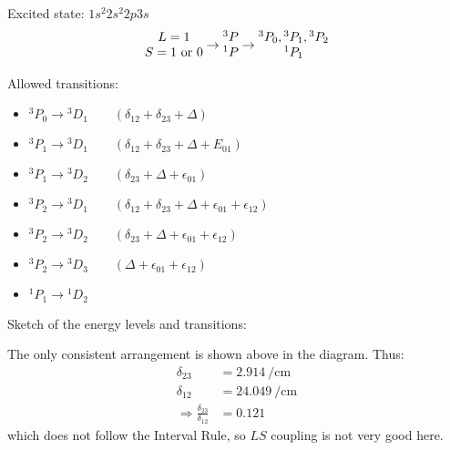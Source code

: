 \begin{parts}
	Excited state: $1s^2 2s^2 2p 3s$
	\begin{equation*}
		\begin{matrix}
			L=1 \\
			S=1 \textnormal{ or } 0
		\end{matrix}
		\rightarrow
		\begin{matrix}
			{}^3 P \\
			{}^1 P
		\end{matrix}
		\rightarrow
		\begin{matrix}
			{}^3 P_0, {}^3 P_1, {}^3 P_2 \\
			{}^1 P_1
		\end{matrix}
	\end{equation*}
	
	Allowed transitions:
	\begin{itemize}
		\item ${}^3 P_0 \to {}^3 D_1 \qquad (\delta_{12} + \delta_{23} + \Delta)$
		\item ${}^3 P_1 \to {}^3 D_1 \qquad (\delta_{12} + \delta_{23} + \Delta + E_{01})$
		\item ${}^3 P_1 \to {}^3 D_2 \qquad (\delta_{23} + \Delta + \epsilon_{01})$
		\item ${}^3 P_2 \to {}^3 D_1 \qquad (\delta_{12} + \delta_{23} + \Delta + \epsilon_{01} + \epsilon_{12})$
		\item ${}^3 P_2 \to {}^3 D_2 \qquad (\delta_{23} + \Delta + \epsilon_{01} + \epsilon_{12})$
		\item ${}^3 P_2 \to {}^3 D_3 \qquad (\Delta + \epsilon_{01} + \epsilon_{12})$
		\item ${}^1 P_1 \to {}^1 D_2$
	\end{itemize}
	
	\newpage
	Sketch of the energy levels and transitions:
	
	The only consistent arrangement is shown above in the diagram.
	Thus:
	\begin{align*}
		\delta_{23} &= \SI{2.914}{\per\centi\metre} \\
		\delta_{12} &= \SI{24.049}{\per\centi\metre} \\
		\Rightarrow \frac{\delta_{23}}{\delta_{12}} &= \num{0.121}
	\end{align*}
	which does not follow the Interval Rule, so $LS$ coupling is not very good here.
\end{parts}